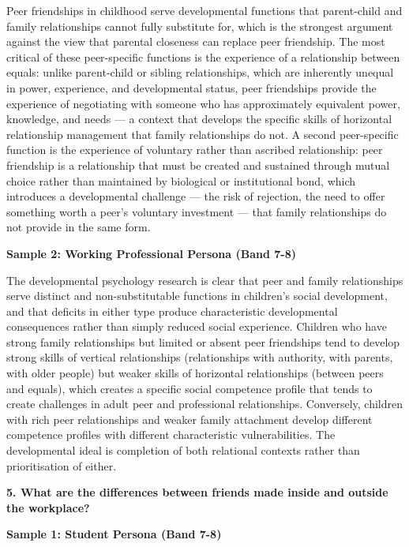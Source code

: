 Peer friendships in childhood serve developmental functions that parent-child and family relationships cannot fully substitute for, which is the strongest argument against the view that parental closeness can replace peer friendship. The most critical of these peer-specific functions is the experience of a relationship between equals: unlike parent-child or sibling relationships, which are inherently unequal in power, experience, and developmental status, peer friendships provide the experience of negotiating with someone who has approximately equivalent power, knowledge, and needs — a context that develops the specific skills of horizontal relationship management that family relationships do not. A second peer-specific function is the experience of voluntary rather than ascribed relationship: peer friendship is a relationship that must be created and sustained through mutual choice rather than maintained by biological or institutional bond, which introduces a developmental challenge — the risk of rejection, the need to offer something worth a peer's voluntary investment — that family relationships do not provide in the same form.

\textbf{Sample 2: Working Professional Persona (Band 7-8)}

The developmental psychology research is clear that peer and family relationships serve distinct and non-substitutable functions in children's social development, and that deficits in either type produce characteristic developmental consequences rather than simply reduced social experience. Children who have strong family relationships but limited or absent peer friendships tend to develop strong skills of vertical relationships (relationships with authority, with parents, with older people) but weaker skills of horizontal relationships (between peers and equals), which creates a specific social competence profile that tends to create challenges in adult peer and professional relationships. Conversely, children with rich peer relationships and weaker family attachment develop different competence profiles with different characteristic vulnerabilities. The developmental ideal is completion of both relational contexts rather than prioritisation of either.

\separator

\begin{ieltsquestion}
\textbf{5. What are the differences between friends made inside and outside the workplace?}
\end{ieltsquestion}
\textbf{Sample 1: Student Persona (Band 7-8)}


